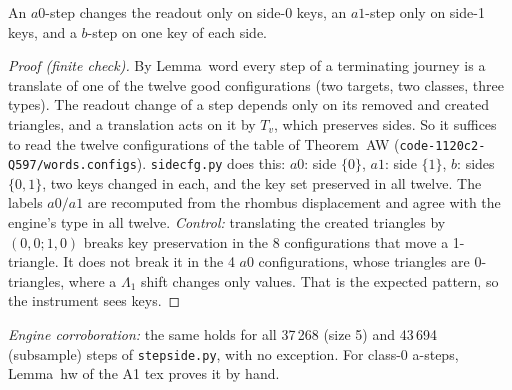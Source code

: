 \documentclass[11pt]{article}
\theoremstyle{definition}\newtheorem{definition}[theorem]{Definition}\newtheorem{remark}[theorem]{Remark}
\begin{document}
\begin{lemma}\label{lem:side}
An $a0$-step changes the readout only on side-0 keys, an $a1$-step only on side-1 keys, and a $b$-step on one key of each side.
\end{lemma}
\begin{proof}[Proof (finite check)]
By Lemma~word every step of a terminating journey is a translate of one of the twelve good configurations (two targets, two classes, three types). The readout change of a step depends only on its removed and created triangles, and a translation acts on it by $T_v$, which preserves sides. So it suffices to read the twelve configurations of the table of Theorem~AW (\texttt{code-1120c2-Q597/words.configs}). \texttt{sidecfg.py} does this: $a0$: side $\{0\}$, $a1$: side $\{1\}$, $b$: sides $\{0,1\}$, two keys changed in each, and the key set preserved in all twelve. The labels $a0/a1$ are recomputed from the rhombus displacement and agree with the engine's type in all twelve.
\emph{Control:} translating the created triangles by $(0,0;1,0)$ breaks key preservation in the 8 configurations that move a 1-triangle. It does not break it in the 4 $a0$ configurations, whose triangles are 0-triangles, where a $\Lambda_1$ shift changes only values. That is the expected pattern, so the instrument sees keys.
\end{proof}
\noindent\emph{Engine corroboration:} the same holds for all 37\,268 (size 5) and 43\,694 (subsample) steps of \texttt{stepside.py}, with no exception. For class-0 a-steps, Lemma~hw of the A1 tex proves it by hand.
\end{document}
